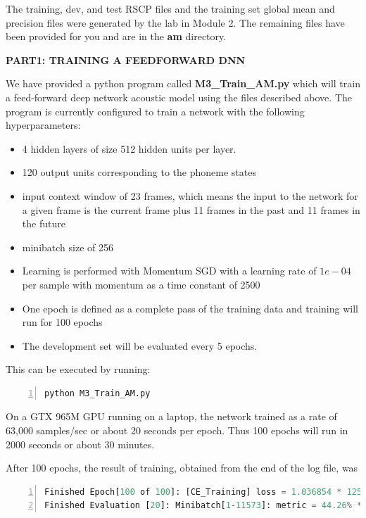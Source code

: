 The training, dev, and test RSCP files and the training set global mean and precision files were generated by the lab in Module 2. The remaining files have been provided for you and are in the {\bf am} directory.

{\bf PART1: TRAINING A FEEDFORWARD DNN}

We have provided a python program called {\bf M3\_Train\_AM.py} which will train a feed-forward deep network acoustic model using the files described above. The program is currently configured to train a network with the following hyperparameters:
\begin{itemize}
	\item 4 hidden layers of size 512 hidden units per layer.
	\item 120 output units corresponding to the phoneme states
	\item input context window of 23 frames, which means the input to the network for a given frame is the current frame plus 11 frames in the past and 11 frames in the future
	\item minibatch size of 256
	\item Learning is performed with Momentum SGD with a learning rate of $1e-04$ per sample with momentum as a time constant of 2500
	\item One epoch is defined as a complete pass of the training data and training will run for 100 epochs
	\item The development set will be evaluated every 5 epochs.
\end{itemize}

This can be executed by running:
\begin{lstlisting}[language = python, numbers=left, 
				 numberstyle=\tiny,keywordstyle=\color{blue!70},
				 commentstyle=\color{red!50!green!50!blue!50},frame=shadowbox,
				 rulesepcolor=\color{red!20!green!20!blue!20},basicstyle=\ttfamily]
python M3_Train_AM.py
\end{lstlisting}

On a GTX 965M GPU running on a laptop, the network trained as a rate of 63,000 samples/sec or about 20 seconds per epoch. Thus 100 epochs will run in 2000 seconds or about 30 minutes.

After 100 epochs, the result of training, obtained from the end of the log file, was
\begin{lstlisting}[language = python, numbers=left, 
				 numberstyle=\tiny,keywordstyle=\color{blue!70},
				 commentstyle=\color{red!50!green!50!blue!50},frame=shadowbox,
				 rulesepcolor=\color{red!20!green!20!blue!20},basicstyle=\ttfamily]
Finished Epoch[100 of 100]: [CE_Training] loss = 1.036854 * 1257104, metric = 32.74% * 1257104 17.146s (73317.6 samples/s);
Finished Evaluation [20]: Minibatch[1-11573]: metric = 44.26% * 370331;
\end{lstlisting}

